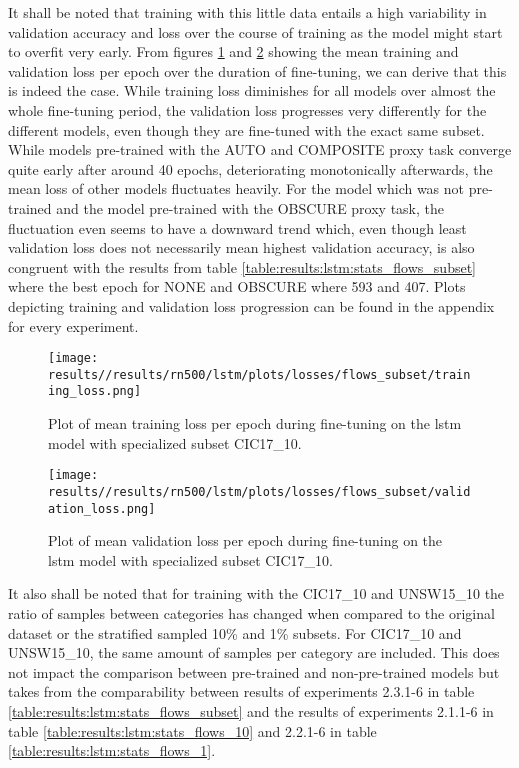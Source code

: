 

It shall be noted that training with this little data entails a high variability in validation accuracy and loss over the course of training as the model might start to overfit very early. From figures \ref{fig:results:lstm:flows_subset_training_loss} and \ref{fig:results:lstm:flows_subset_validation_loss} showing the mean training and validation loss per epoch over the duration of fine-tuning, we can derive that this is indeed the case. While training loss diminishes for all models over almost the whole fine-tuning period, the validation loss progresses very differently for the different models, even though they are fine-tuned with the exact same subset. While models pre-trained with the AUTO and COMPOSITE proxy task converge quite early after around 40 epochs, deteriorating monotonically afterwards, the mean loss of other models fluctuates heavily. For the model which was not pre-trained and the model pre-trained with the OBSCURE proxy task, the fluctuation even seems to have a downward trend which, even though least validation loss does not necessarily mean highest validation accuracy, is also congruent with the results from table \ref{table:results:lstm:stats_flows_subset} where the best epoch for NONE and OBSCURE where 593 and 407. Plots depicting training and validation loss progression can be found in the appendix for every experiment.


\begin{figure}[h]
	\centering
	\texttt{[image: results//results/rn500/lstm/plots/losses/flows\_subset/training\_loss.png]}
	\caption{Plot of mean training loss per epoch during fine-tuning on the \gls{lstm} model with specialized subset CIC17\_10.}
	\label{fig:results:lstm:flows_subset_training_loss}
\end{figure}

\begin{figure}[h]
	\centering
	\texttt{[image: results//results/rn500/lstm/plots/losses/flows\_subset/validation\_loss.png]}
	\caption{Plot of mean validation loss per epoch during fine-tuning on the \gls{lstm} model with specialized subset CIC17\_10.}
	\label{fig:results:lstm:flows_subset_validation_loss}
\end{figure}

It also shall be noted that for training with the CIC17\_10 and UNSW15\_10 the ratio of samples between categories has changed when compared to the original dataset or the stratified sampled 10\% and 1\% subsets. For CIC17\_10 and UNSW15\_10, the same amount of samples per category are included. This does not impact the comparison between pre-trained and non-pre-trained models but takes from the comparability between results of experiments 2.3.1-6 in table \ref{table:results:lstm:stats_flows_subset} and the results of experiments 2.1.1-6 in table \ref{table:results:lstm:stats_flows_10} and 2.2.1-6 in table \ref{table:results:lstm:stats_flows_1}. \par

